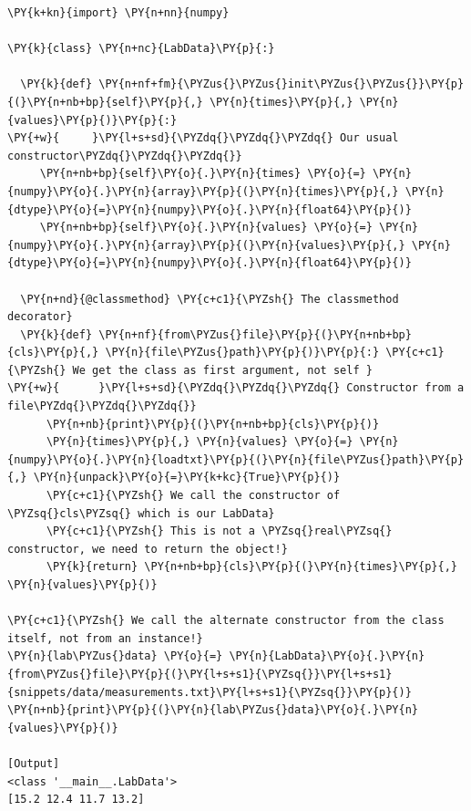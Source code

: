 \begin{Verbatim}[label=\makebox{\url{https://github.com/lucabaldini/cmepda/tree/master/slides/latex/snippets/classmethod.py}},commandchars=\\\{\}]
\PY{k+kn}{import} \PY{n+nn}{numpy}

\PY{k}{class} \PY{n+nc}{LabData}\PY{p}{:}
  
  \PY{k}{def} \PY{n+nf+fm}{\PYZus{}\PYZus{}init\PYZus{}\PYZus{}}\PY{p}{(}\PY{n+nb+bp}{self}\PY{p}{,} \PY{n}{times}\PY{p}{,} \PY{n}{values}\PY{p}{)}\PY{p}{:}
\PY{+w}{     }\PY{l+s+sd}{\PYZdq{}\PYZdq{}\PYZdq{} Our usual constructor\PYZdq{}\PYZdq{}\PYZdq{}}
     \PY{n+nb+bp}{self}\PY{o}{.}\PY{n}{times} \PY{o}{=} \PY{n}{numpy}\PY{o}{.}\PY{n}{array}\PY{p}{(}\PY{n}{times}\PY{p}{,} \PY{n}{dtype}\PY{o}{=}\PY{n}{numpy}\PY{o}{.}\PY{n}{float64}\PY{p}{)}
     \PY{n+nb+bp}{self}\PY{o}{.}\PY{n}{values} \PY{o}{=} \PY{n}{numpy}\PY{o}{.}\PY{n}{array}\PY{p}{(}\PY{n}{values}\PY{p}{,} \PY{n}{dtype}\PY{o}{=}\PY{n}{numpy}\PY{o}{.}\PY{n}{float64}\PY{p}{)}

  \PY{n+nd}{@classmethod} \PY{c+c1}{\PYZsh{} The classmethod decorator}
  \PY{k}{def} \PY{n+nf}{from\PYZus{}file}\PY{p}{(}\PY{n+nb+bp}{cls}\PY{p}{,} \PY{n}{file\PYZus{}path}\PY{p}{)}\PY{p}{:} \PY{c+c1}{\PYZsh{} We get the class as first argument, not self }
\PY{+w}{      }\PY{l+s+sd}{\PYZdq{}\PYZdq{}\PYZdq{} Constructor from a file\PYZdq{}\PYZdq{}\PYZdq{}}
      \PY{n+nb}{print}\PY{p}{(}\PY{n+nb+bp}{cls}\PY{p}{)}
      \PY{n}{times}\PY{p}{,} \PY{n}{values} \PY{o}{=} \PY{n}{numpy}\PY{o}{.}\PY{n}{loadtxt}\PY{p}{(}\PY{n}{file\PYZus{}path}\PY{p}{,} \PY{n}{unpack}\PY{o}{=}\PY{k+kc}{True}\PY{p}{)}
      \PY{c+c1}{\PYZsh{} We call the constructor of \PYZsq{}cls\PYZsq{} which is our LabData}
      \PY{c+c1}{\PYZsh{} This is not a \PYZsq{}real\PYZsq{} constructor, we need to return the object!}
      \PY{k}{return} \PY{n+nb+bp}{cls}\PY{p}{(}\PY{n}{times}\PY{p}{,} \PY{n}{values}\PY{p}{)}

\PY{c+c1}{\PYZsh{} We call the alternate constructor from the class itself, not from an instance!}
\PY{n}{lab\PYZus{}data} \PY{o}{=} \PY{n}{LabData}\PY{o}{.}\PY{n}{from\PYZus{}file}\PY{p}{(}\PY{l+s+s1}{\PYZsq{}}\PY{l+s+s1}{snippets/data/measurements.txt}\PY{l+s+s1}{\PYZsq{}}\PY{p}{)}
\PY{n+nb}{print}\PY{p}{(}\PY{n}{lab\PYZus{}data}\PY{o}{.}\PY{n}{values}\PY{p}{)}

[Output]
<class '__main__.LabData'>
[15.2 12.4 11.7 13.2]
\end{Verbatim}